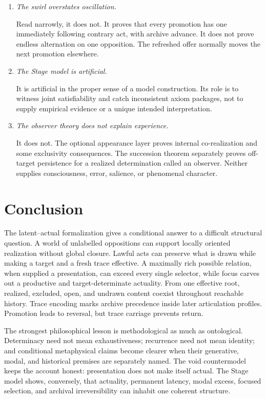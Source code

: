 \documentclass[11pt]{article}
\theoremstyle{definition}
\theoremstyle{remark}
\begin{document}
\begin{enumerate}[label=\textbf{O\arabic*.}, leftmargin=*, align=left]
  \item \emph{The swirl overstates oscillation.}

  Read narrowly, it does not. It proves that every promotion has one immediately
  following contrary act, with archive advance. It does not prove endless
  alternation on one opposition. The refreshed offer normally moves the next
  promotion elsewhere.

  \item \emph{The Stage model is artificial.}

  It is artificial in the proper sense of a model construction. Its role is to
  witness joint satisfiability and catch inconsistent axiom packages, not to
  supply empirical evidence or a unique intended interpretation.

  \item \emph{The observer theory does not explain experience.}

  It does not. The optional appearance layer proves internal co-realization and
  some exclusivity consequences. The succession theorem separately proves
  off-target persistence for a realized determination called an observer.
  Neither supplies consciousness, error, salience, or phenomenal character.
\end{enumerate}

\section{Conclusion}

The latent--actual formalization gives a conditional answer to a difficult
structural question. A world of unlabelled oppositions can support locally
oriented realization without global closure. Lawful acts can preserve what is
drawn while making a target and a fresh trace effective. A maximally rich
possible relation, when supplied a presentation, can exceed every single
selector, while focus carves out a productive and target-determinate actuality.
From one effective root, realized, excluded, open, and undrawn content coexist
throughout reachable history. Trace encoding marks archive precedence inside
later articulation profiles. Promotion leads to reversal, but trace carriage
prevents return.

The strongest philosophical lesson is methodological as much as ontological.
Determinacy need not mean exhaustiveness; recurrence need not mean identity;
and conditional metaphysical claims become clearer when their generative,
modal, and historical premises are separately named. The void countermodel
keeps the account honest: presentation does not make itself actual. The Stage
model shows, conversely, that actuality, permanent latency, modal excess,
focused selection, and archival irreversibility can inhabit one coherent
structure.
\end{document}
